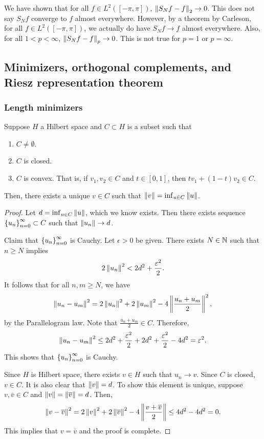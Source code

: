 \documentclass[a4paper]{article}
\begin{document}
\begin{remark}
We have shown that for all $f \in L^2([-\pi, \pi])$,
$\left\lVert S_N f - f\right\rVert_2 \to 0$. This does not say $S_N f$ 
converge to $f$ almost everywhere. However, by a theorem 
by Carleson, for all $f \in L^2([-\pi, \pi])$, 
we actually do have $S_N f \to f$ almost everywhere.
Also, for all $1 < p < \infty$, $\left\lVert S_N f - f\right\rVert_p \to 0$.
This is not true for $p = 1$ or $p = \infty$.
\end{remark}

\subsection{Minimizers, orthogonal complements, and 
Riesz representation theorem}

\subsubsection*{Length minimizers}

\begin{thm}
Suppose $H$ a Hilbert space and $C \subset H$ is a subset 
such that 
\begin{enumerate}
  \item $C \neq \emptyset$. 
  \item $C$ is closed. 
  \item $C$ is convex. That is, if $v_1, v_2 \in C$ 
  and $t \in [0, 1]$, then $tv_1 + (1 - t)v_2 \in C$.
\end{enumerate}
Then, there exists a unique $v \in C$ such that 
$\left\lVert v\right\rVert = \inf_{u \in C} \left\lVert u\right\rVert$.
\end{thm}

\begin{proof}
Let $d = \inf_{u \in C} \left\lVert u\right\rVert$, which we know exists.
Then there exists sequence $\left\{ u_n \right\}_{n=0}^\infty \subset C$ such 
that $\left\lVert u_n\right\rVert \to d$. 

Claim that $\left\{ u_n \right\}_{n=0}^\infty$ is 
Cauchy. Let $\epsilon > 0$ be given. There exists 
$N \in \mathbb{N}$ such that $n \geq N$ implies 
\[
2 \left\lVert u_n\right\rVert^2 
< 2 d^2 + \frac{\varepsilon^2}{2}.
\]
It follows that for 
all $n, m \geq N$, we have 
\[
\left\lVert u_n - u_m\right\rVert^2 = 2 \left\lVert u_n\right\rVert^2 + 2 \left\lVert u_m\right\rVert^2 
- 4 \left\lVert \frac{u_n + u_m}{2}\right\rVert^2,
\]
by the Parallelogram law. Note that $\frac{u_n + u_m}{2} \in C$.
Therefore, 
\[
\left\lVert u_n - u_m\right\rVert^2 \leq 2 d^2 + \frac{\varepsilon^2}{2} 
+ 2 d^2 + \frac{\varepsilon^2}{2} - 4d^2 = \varepsilon^2.
\]
This shows that $\left\{ u_n \right\}_{n=0}^\infty$ is Cauchy. 

Since $H$ is Hilbert space, there exists $v \in H$
such that $u_n \to v$. Since $C$ is closed, $v \in C$. 
It is also clear that $\left\lVert v\right\rVert = d$. To show this 
element is unique, suppose $v, \bar{v} \in C$ 
and $\left\lVert v\right\rVert = \left\lVert \overline{v}\right\rVert = d$. Then, 
\[
\begin{aligned}
  \left\lVert v - \overline{v}\right\rVert^2 
  = 2 \left\lVert v\right\rVert^2 + 2 \left\lVert \overline{v}\right\rVert^2 
  - 4 \left\lVert \frac{v + \overline{v}}{2}\right\rVert 
  \leq 4d^2 - 4d^2 
  = 0.
\end{aligned}
\]
This implies that $v = \bar{v}$ and the proof 
is complete.
\end{proof}
\end{document}
